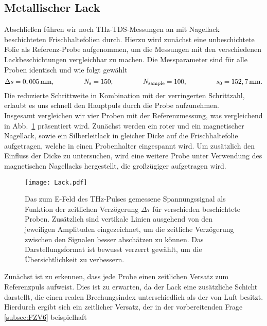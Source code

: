 \subsection{\label{sec:A24}Metallischer Lack}
Abschließen führen wir noch THz-TDS-Messungen an mit Nagellack beschichteten Frischhaltefolien 
durch. Hierzu wird zunächst eine unbeschichtete Folie als Referenz-Probe aufgenommen, um die 
Messungen mit den verschiedenen Lackbeschichtungen vergleichbar zu machen. Die Messparameter 
sind für alle Proben identisch und wie folgt gewählt
\begin{equation}
    \Delta s = 0,005\,\si{mm}, \hspace{1.5cm} N_{\text{s}} = 150, \hspace{1.5cm} N_{\text{sample}} = 100, \hspace{1.5cm} s_{0} = 152,7\,\si{mm}.
\end{equation} 
Die reduzierte Schrittweite in Kombination mit der verringerten Schrittzahl, erlaubt es uns schnell den 
Hauptpuls durch die Probe aufzunehmen. \\
Insgesamt vergleichen wir vier Proben mit der Referenzmessung, was vergleichend in Abb.~\ref{fig:lack} 
präsentiert wird. Zunächst werden ein roter und ein magnetischer Nagellack, sowie ein Silberleitlack 
in gleicher Dicke auf die Frischhaltefolie aufgetragen, welche in einen Probenhalter eingespannt wird. 
Um zusätzlich den Einfluss der Dicke zu untersuchen, wird eine weitere Probe unter Verwendung 
des magnetischen Nagellacks hergestellt, die großzügiger aufgetragen wird.
\begin{figure}[h!]
    \centering
    \texttt{[image: Lack.pdf]}
    \caption{\label{fig:lack}Das zum E-Feld des THz-Pulses gemessene Spannungssignal als Funktion der 
    zeitlichen Verzögerung $\Delta\tau$ für verschieden beschichtete Proben. Zusätzlich sind vertikale 
    Linien ausgehend von den jeweiligen Amplituden eingezeichnet, um die zeitliche Verzögerung 
    zwischen den Signalen besser abschätzen zu können. Das Darstellungsformat ist bewusst 
    verzerrt gewählt, um die Übersichtlichkeit zu verbessern.}
\end{figure}\FloatBarrier
Zunächst ist zu erkennen, dass jede Probe einen 
zeitlichen Versatz zum Referenzpuls aufweist. 
Dies ist zu erwarten, da der Lack eine zusätzliche 
Schicht darstellt, die einen realen Brechungsindex
unterschiedlich als der von Luft besitzt. Hierdurch ergibt sich
ein zeitlicher Versatz, der in der 
vorbereitenden Frage \ref{subsec:FZV6} beispielhaft
